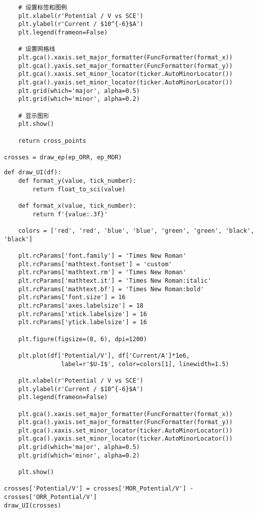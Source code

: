 \begin{verbatim}
    # 设置标签和图例
    plt.xlabel(r'Potential / V vs SCE')
    plt.ylabel(r'Current / $10^{-6}$A')
    plt.legend(frameon=False)

    # 设置网格线
    plt.gca().xaxis.set_major_formatter(FuncFormatter(format_x))
    plt.gca().yaxis.set_major_formatter(FuncFormatter(format_y))
    plt.gca().xaxis.set_minor_locator(ticker.AutoMinorLocator())
    plt.gca().yaxis.set_minor_locator(ticker.AutoMinorLocator())
    plt.grid(which='major', alpha=0.5)
    plt.grid(which='minor', alpha=0.2)

    # 显示图形
    plt.show()

    return cross_points

crosses = draw_ep(ep_ORR, ep_MOR)
\end{verbatim}

\begin{verbatim}
def draw_UI(df):
    def format_y(value, tick_number):
        return float_to_sci(value)

    def format_x(value, tick_number):
        return f'{value:.3f}'

    colors = ['red', 'red', 'blue', 'blue', 'green', 'green', 'black', 'black']

    plt.rcParams['font.family'] = 'Times New Roman'
    plt.rcParams['mathtext.fontset'] = 'custom'
    plt.rcParams['mathtext.rm'] = 'Times New Roman'
    plt.rcParams['mathtext.it'] = 'Times New Roman:italic'
    plt.rcParams['mathtext.bf'] = 'Times New Roman:bold'
    plt.rcParams['font.size'] = 16
    plt.rcParams['axes.labelsize'] = 18
    plt.rcParams['xtick.labelsize'] = 16
    plt.rcParams['ytick.labelsize'] = 16

    plt.figure(figsize=(8, 6), dpi=1200)

    plt.plot(df['Potential/V'], df['Current/A']*1e6, 
                label=r'$U-I$', color=colors[1], linewidth=1.5)
    
    plt.xlabel(r'Potential / V vs SCE')
    plt.ylabel(r'Current / $10^{-6}$A')
    plt.legend(frameon=False)
    
    plt.gca().xaxis.set_major_formatter(FuncFormatter(format_x))
    plt.gca().yaxis.set_major_formatter(FuncFormatter(format_y))
    plt.gca().xaxis.set_minor_locator(ticker.AutoMinorLocator())
    plt.gca().yaxis.set_minor_locator(ticker.AutoMinorLocator())
    plt.grid(which='major', alpha=0.5)
    plt.grid(which='minor', alpha=0.2)

    plt.show()
    
crosses['Potential/V'] = crosses['MOR_Potential/V'] - crosses['ORR_Potential/V']
draw_UI(crosses)
\end{verbatim}

